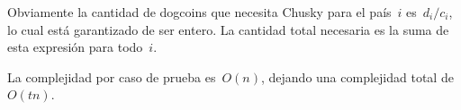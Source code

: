 
Obviamente la cantidad de dogcoins que necesita Chusky para el país~$i$
es~$d_i / c_i$, lo cual está garantizado de ser entero. La cantidad total necesaria
es la suma de esta expresión para todo~$i$.

La complejidad por caso de prueba es~$O(n)$, dejando una complejidad total
de~$O(t n)$.

